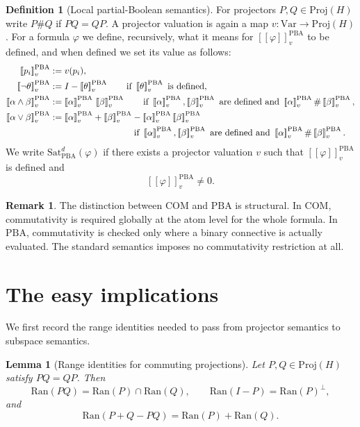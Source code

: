 \documentclass[11pt]{article}
\theoremstyle{plain}
\newtheorem{lemma}[theorem]{Lemma}
\theoremstyle{definition}
\newtheorem{definition}[theorem]{Definition}
\newtheorem{remark}[theorem]{Remark}
\newcommand{\COM}{\mathrm{COM}}
\newcommand{\PBA}{\mathrm{PBA}}
\newcommand{\Sat}{\mathrm{Sat}}
\newcommand{\Proj}{\mathrm{Proj}}
\newcommand{\Ran}{\mathrm{Ran}}
\newcommand{\Var}{\mathrm{Var}}
\newcommand{\sem}[1]{\left[\!\left[#1\right]\!\right]}
\begin{document}
\begin{definition}[Local partial-Boolean semantics]
For projectors $P,Q\in\Proj(H)$ write $P\# Q$ if $PQ=QP$.
A projector valuation is again a map $v:\Var\to\Proj(H)$.
For a formula $\varphi$ we define, recursively, what it means for $\sem{\varphi}^{\PBA}_v$ to be defined, and when defined we set its value as follows:
\begin{align*}
\sem{p_i}^{\PBA}_v &:= v(p_i),\\
\sem{\neg\theta}^{\PBA}_v &:= I-\sem{\theta}^{\PBA}_v \qquad \text{if } \sem{\theta}^{\PBA}_v \text{ is defined},\\
\sem{\alpha\wedge\beta}^{\PBA}_v &:= \sem{\alpha}^{\PBA}_v\,\sem{\beta}^{\PBA}_v \qquad \text{if } \sem{\alpha}^{\PBA}_v,\sem{\beta}^{\PBA}_v \text{ are defined and } \sem{\alpha}^{\PBA}_v \# \sem{\beta}^{\PBA}_v,\\
\sem{\alpha\vee\beta}^{\PBA}_v &:= \sem{\alpha}^{\PBA}_v + \sem{\beta}^{\PBA}_v - \sem{\alpha}^{\PBA}_v\sem{\beta}^{\PBA}_v \\
&\hspace{3.3cm}\text{if } \sem{\alpha}^{\PBA}_v,\sem{\beta}^{\PBA}_v \text{ are defined and } \sem{\alpha}^{\PBA}_v \# \sem{\beta}^{\PBA}_v.
\end{align*}
We write $\Sat_{\PBA}^d(\varphi)$ if there exists a projector valuation $v$ such that $\sem{\varphi}^{\PBA}_v$ is defined and
\[
\sem{\varphi}^{\PBA}_v\neq 0.
\]
\end{definition}

\begin{remark}
The distinction between \(\COM\) and \(\PBA\) is structural.
In \(\COM\), commutativity is required globally at the atom level for the whole formula.
In \(\PBA\), commutativity is checked only where a binary connective is actually evaluated.
The standard semantics imposes no commutativity restriction at all.
\end{remark}

\section{The easy implications}

We first record the range identities needed to pass from projector semantics to subspace semantics.

\begin{lemma}[Range identities for commuting projections]\label{lem:range-identities}
Let $P,Q\in\Proj(H)$ satisfy $PQ=QP$.
Then
\[
\Ran(PQ)=\Ran(P)\cap \Ran(Q),
\qquad
\Ran(I-P)=\Ran(P)^{\perp},
\]
and
\[
\Ran(P+Q-PQ)=\Ran(P)+\Ran(Q).
\]
\end{lemma}
\end{document}
